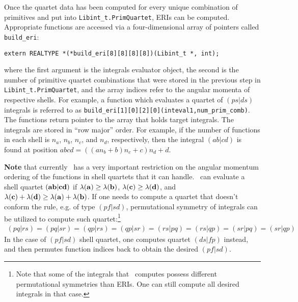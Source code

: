 \documentclass[12pt]{article}
\begin{document}
Once the quartet data has been computed for every unique combination of primitives and put into {\tt Libint\_t.PrimQuartet},
ERIs can be computed. Appropriate functions are accessed via a four-dimensional array of pointers
called {\tt build\_eri}:
\begin{verbatim}
extern REALTYPE *(*build_eri[8][8][8][8])(Libint_t *, int);
\end{verbatim}
where the first argument is the integrals evaluator object, the second is the number of primitive quartet
combinations that were stored in the previous step in {\tt Libint\_t.PrimQuartet}, and the array indices
refer to the angular momenta of respective shells.
For example, a function which evaluates a quartet of $(ps|ds)$ integrals is referred to as \linebreak
{\tt build\_eri[1][0][2][0](inteval1,num\_prim\_comb)}. The functions return pointer to the array that holds
target integrals. The integrals are stored in ``row major'' order.\cite{KnuthACP} For example, if
the number of functions in each shell is $n_a$, $n_b$, $n_c$, and $n_d$, respectively,
then the integral $(ab|cd)$ is found at position $abcd = ( (a n_b + b) n_c + c) n_d + d$.

{\bf Note} that currently \LIBINT\ has a very important restriction on the angular momentum ordering of the functions
in shell quartets that it can handle. \LIBINT\ can evaluate a shell quartet
$({\bf ab}|{\bf cd})$ if $\lambda({\bf a}) \geq \lambda({\bf b})$,
$\lambda({\bf c}) \geq \lambda({\bf d})$, and $\lambda({\bf c}) + \lambda({\bf d}) \geq \lambda({\bf a}) + \lambda({\bf b})$.
If one needs to compute a quartet that doesn't conform the rule, e.g. of type $(pf|sd)$,
permutational symmetry of integrals can be utilized to compute such quartet:\footnote{Note that some
of the integrals that \librij\ computes possess different permutational symmetries than ERIs. One can still
compute all desired integrals in that case.}
\begin{eqnarray}
(pq|rs) = (pq|sr) = (qp|rs) = (qp|sr) = (rs|pq) = (rs|qp)= (sr|pq) = (sr|qp)
\end{eqnarray}
In the case of $(pf|sd)$ shell quartet, one computes quartet $(ds|fp)$ instead, and then
permutes function indices back to obtain the desired $(pf|sd)$.
\end{document}
